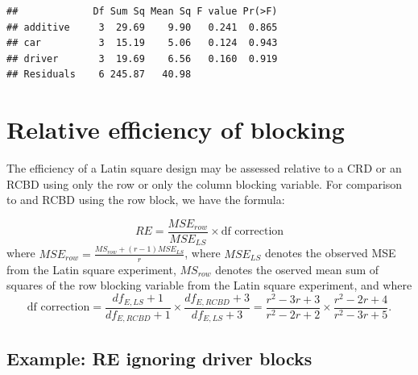 \documentclass[
]{book}
\newenvironment{Shaded}{\begin{snugshade}}{\end{snugshade}}
\newcommand{\AttributeTok}[1]{\textcolor[rgb]{0.77,0.63,0.00}{#1}}
\newcommand{\FunctionTok}[1]{\textcolor[rgb]{0.00,0.00,0.00}{#1}}
\newcommand{\NormalTok}[1]{#1}
\newcommand{\OtherTok}[1]{\textcolor[rgb]{0.56,0.35,0.01}{#1}}
\newcommand{\SpecialCharTok}[1]{\textcolor[rgb]{0.00,0.00,0.00}{#1}}
\begin{document}
\begin{Shaded}
\end{Shaded}

\begin{verbatim}
##             Df Sum Sq Mean Sq F value Pr(>F)
## additive     3  29.69    9.90   0.241  0.865
## car          3  15.19    5.06   0.124  0.943
## driver       3  19.69    6.56   0.160  0.919
## Residuals    6 245.87   40.98
\end{verbatim}

\hypertarget{relative-efficiency-of-blocking}{%
\section{Relative efficiency of blocking}\label{relative-efficiency-of-blocking}}

The efficiency of a Latin square design may be assessed relative to a CRD or an RCBD using only the row or only the column blocking variable. For comparison to and RCBD using the row block, we have the formula:

\[RE = \frac{MSE_{row}}{MSE_{LS}} \times \text{df correction}\]
where \(MSE_{row} = \frac{MS_{row} + (r-1)MSE_{LS}}{r}\), where \(MSE_{LS}\) denotes the observed MSE from the Latin square experiment, \(MS_{row}\) denotes the oserved mean sum of squares of the row blocking variable from the Latin square experiment, and where
\[\text{df correction} = \frac{df_{E, LS}+1}{df_{E,RCBD} + 1}\times\frac{df_{E,RCBD}+3}{df_{E,LS}+3} = \frac{r^2-3r+3}{r^2-2r+2}\times\frac{r^2-2r+4}{r^2-3r+5}.\]

\hypertarget{example-re-ignoring-driver-blocks}{%
\subsection{Example: RE ignoring driver blocks}\label{example-re-ignoring-driver-blocks}}
\end{document}
